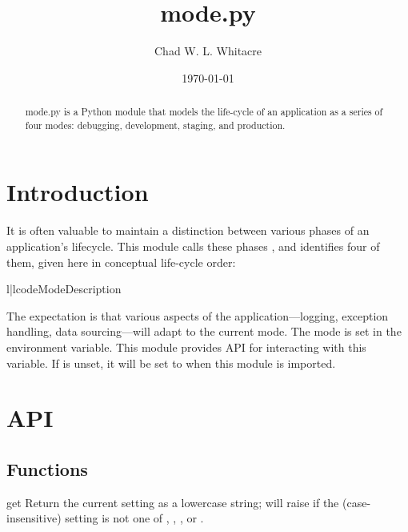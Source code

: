 \documentclass{manual}
\title{mode.py}
\author{Chad W. L. Whitacre}
\date\today
\begin{document}
\maketitle

\begin{abstract}

\noindent
mode.py is a Python module that models the life-cycle of an application as a
series of four modes: debugging, development, staging, and production.

\end{abstract}

\chapter{Introduction}

It is often valuable to maintain a distinction between various phases of an
application's lifecycle. This module calls these phases , and
identifies four of them, given here in conceptual life-cycle order:

\begin{tableii}{l|l}{code}{Mode}{Description}
\end{tableii}


The expectation is that various aspects of the application---logging, exception
handling, data sourcing---will adapt to the current mode. The mode is set in the
 environment variable. This module provides API for
interacting with this variable. If  is unset, it will be set
to  when this module is imported.

\chapter{API}

\section{Functions}

\begin{funcdesc}{get}{}
Return the current  setting as a lowercase string; will raise
 if the (case-insensitive) setting is not one of
, , , or .
\end{funcdesc}
\end{document}
